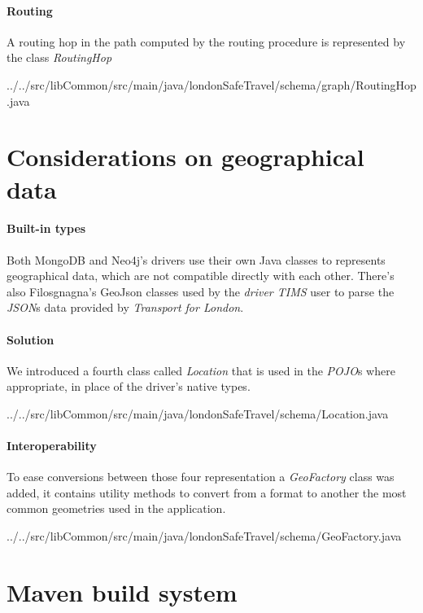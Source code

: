 \paragraph{Routing}
A routing hop in the path computed by the routing procedure is represented by 
the class \textit{RoutingHop}


{../../src/libCommon/src/main/java/londonSafeTravel/schema/graph/RoutingHop.java}

\section{Considerations on geographical data}

\paragraph{Built-in types} %
Both MongoDB and Neo4j's drivers use their own Java classes to represents 
geographical data, which are not compatible directly with each other. There's 
also Filosgnagna's GeoJson classes used by the \textit{driver TIMS} user to 
parse the \textit{JSON}s data provided by \textit{Transport for London}.

\paragraph{Solution}
We introduced a fourth class called \textit{Location} that is used in the 
\textit{POJO}s where appropriate, in place of the driver's native types.


{../../src/libCommon/src/main/java/londonSafeTravel/schema/Location.java}

\paragraph{Interoperability}
To ease conversions between those four representation a \textit{GeoFactory} 
class was added, it contains utility methods to convert from a format to 
another the most common geometries used in the application.


{../../src/libCommon/src/main/java/londonSafeTravel/schema/GeoFactory.java}

\section{Maven build system}

